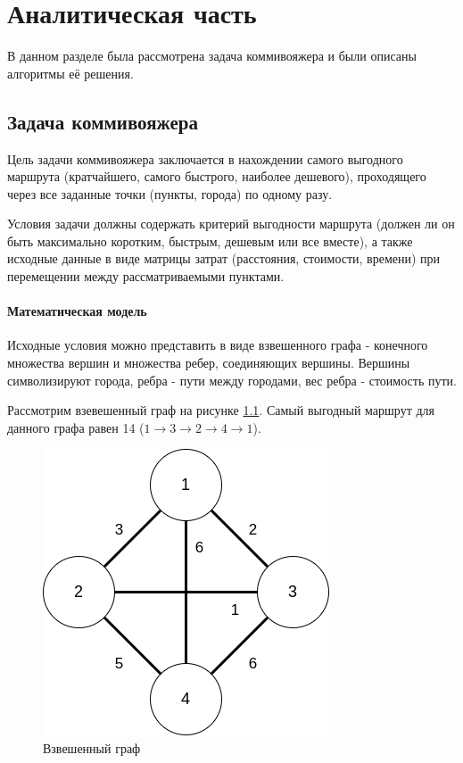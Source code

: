 \chapter{Аналитическая часть}
В данном разделе была рассмотрена задача коммивояжера и были описаны алгоритмы её решения.

\section{Задача коммивояжера}

Цель задачи коммивояжера \cite{model} заключается в нахождении самого выгодного маршрута (кратчайшего, самого быстрого, наиболее дешевого), проходящего через все заданные точки (пункты, города) по одному разу.

Условия задачи должны содержать критерий выгодности маршрута (должен ли он быть максимально коротким, быстрым, дешевым или все вместе), а также исходные данные в виде матрицы затрат (расстояния, стоимости, времени) при перемещении между рассматриваемыми пунктами.

\subsubsection{Математическая модель}
Исходные условия можно представить в виде взвешенного графа - конечного множества вершин и множества ребер, соединяющих вершины. Вершины символизируют города, ребра - пути между городами, вес ребра - стоимость пути.

Рассмотрим взевешенный граф на рисунке \ref{img:graph}. Самый выгодный маршрут для данного графа равен 14 ($1 \rightarrow 3 \rightarrow 2 \rightarrow 4 \rightarrow 1$).

\begin{figure}[h]
	\begin{center}
		\includegraphics[scale=0.52]{img/graph.png}
	\end{center}
	\captionsetup{justification=centering}
	\caption{Взвешенный граф}
	\label{img:graph}
\end{figure}

